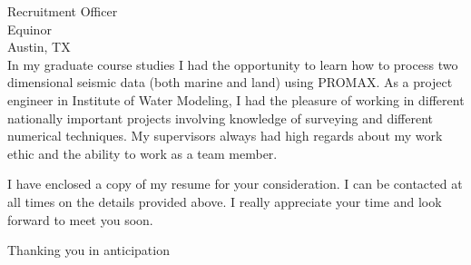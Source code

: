 \documentclass[11pt]{letter} %
\begin{document}
\begin{letter}{Recruitment Officer \\
Equinor \\
Austin, TX \\ 
}
In my graduate course studies I had the opportunity to learn how to process two dimensional seismic data (both marine and land) using PROMAX. As a project engineer in Institute of Water Modeling, I had the pleasure of working in different nationally important projects involving knowledge of surveying and different numerical techniques. My supervisors always had high regards about my work ethic and the ability to work as a team member. 

I have enclosed a copy of my resume for your consideration. I can be contacted at all times on the details provided above. I really appreciate your time and look forward to meet you soon. 


\closing{Thanking you in anticipation}




\end{letter}
\end{document}
